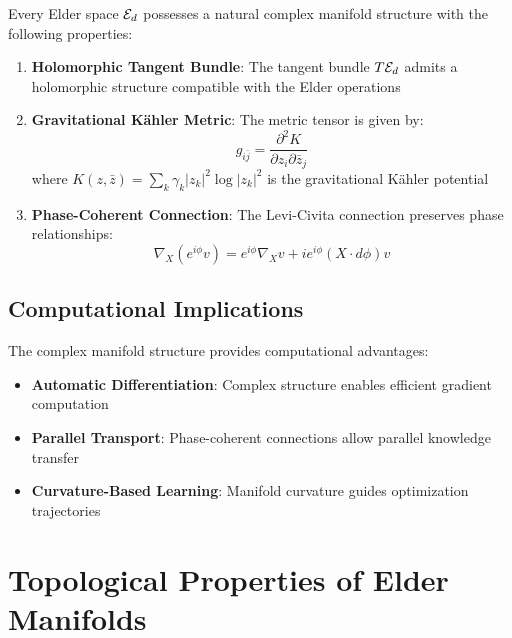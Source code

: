 \begin{theorem}
\label{thm:elder_complex_manifold}
Every Elder space $\mathcal{E}_{d}$ possesses a natural complex manifold structure with the following properties:

\begin{enumerate}
    \item \textbf{Holomorphic Tangent Bundle}: The tangent bundle $T\mathcal{E}_{d}$ admits a holomorphic structure compatible with the Elder operations
    
    \item \textbf{Gravitational Kähler Metric}: The metric tensor is given by:
    \begin{equation}
    g_{i\bar{j}} = \frac{\partial^2 K}{\partial z_i \partial \bar{z}_j}
    \end{equation}
    where $K(z, \bar{z}) = \sum_k \gamma_k |z_k|^2 \log|z_k|^2$ is the gravitational Kähler potential
    
    \item \textbf{Phase-Coherent Connection}: The Levi-Civita connection preserves phase relationships:
    \begin{equation}
    \nabla_X (e^{i\phi} v) = e^{i\phi} \nabla_X v + i e^{i\phi} (X \cdot d\phi) v
    \end{equation}
\end{enumerate}
\end{theorem}

\subsection{Computational Implications}

The complex manifold structure provides computational advantages:

\begin{itemize}
    \item \textbf{Automatic Differentiation}: Complex structure enables efficient gradient computation
    \item \textbf{Parallel Transport}: Phase-coherent connections allow parallel knowledge transfer
    \item \textbf{Curvature-Based Learning}: Manifold curvature guides optimization trajectories
\end{itemize}

\section{Topological Properties of Elder Manifolds}

